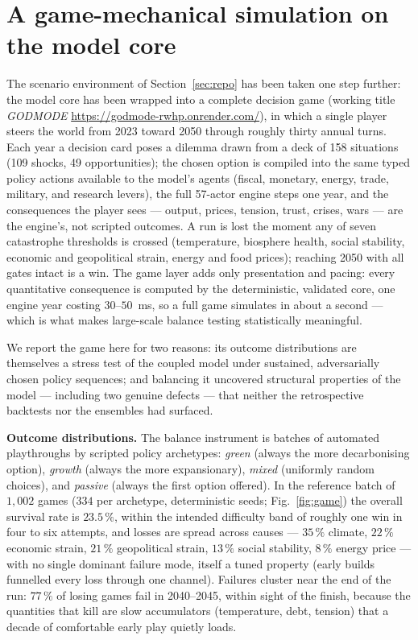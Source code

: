 \documentclass[a4paper,fleqn]{cas-sc}
\begin{document}
\section{A game-mechanical simulation on the model core}
\label{sec:game}

The scenario environment of Section~\ref{sec:repo} has been taken one step further: the model core
has been wrapped into a complete decision game (working title \emph{GODMODE} \url{https://godmode-rwhp.onrender.com/}), in which a single
player steers the world from 2023 toward 2050 through roughly thirty annual turns. Each year a
decision card poses a dilemma drawn from a deck of 158 situations (109 shocks, 49 opportunities);
the chosen option is compiled into the same typed policy actions available to the model's agents
(fiscal, monetary, energy, trade, military, and research levers), the full 57-actor engine steps
one year, and the consequences the player sees --- output, prices, tension, trust, crises, wars ---
are the engine's, not scripted outcomes. A run is lost the moment any of seven catastrophe
thresholds is crossed (temperature, biosphere health, social stability, economic and geopolitical
strain, energy and food prices); reaching 2050 with all gates intact is a win. The game layer adds
only presentation and pacing: every quantitative consequence is computed by the deterministic,
validated core, one engine year costing $30$--$50$~ms, so a full game simulates in about a second
--- which is what makes large-scale balance testing statistically meaningful.

We report the game here for two reasons: its outcome distributions are themselves a stress test of
the coupled model under sustained, adversarially chosen policy sequences; and balancing it
uncovered structural properties of the model --- including two genuine defects --- that neither
the retrospective backtests nor the ensembles had surfaced.

\textbf{Outcome distributions.} The balance instrument is batches of automated playthroughs by
scripted policy archetypes: \emph{green} (always the more decarbonising option), \emph{growth}
(always the more expansionary), \emph{mixed} (uniformly random choices), and \emph{passive}
(always the first option offered). In the reference batch of $1{,}002$ games ($334$ per archetype,
deterministic seeds; Fig.~\ref{fig:game}) the overall survival rate is $23.5\,\%$, within the
intended difficulty band of roughly one win in four to six attempts, and losses are spread across
causes --- $35\,\%$ climate, $22\,\%$ economic strain, $21\,\%$ geopolitical strain, $13\,\%$
social stability, $8\,\%$ energy price --- with no single dominant failure mode, itself a tuned
property (early builds funnelled every loss through one channel). Failures cluster near the end of
the run: $77\,\%$ of losing games fail in 2040--2045, within sight of the finish, because the
quantities that kill are slow accumulators (temperature, debt, tension) that a decade of
comfortable early play quietly loads.
\end{document}
